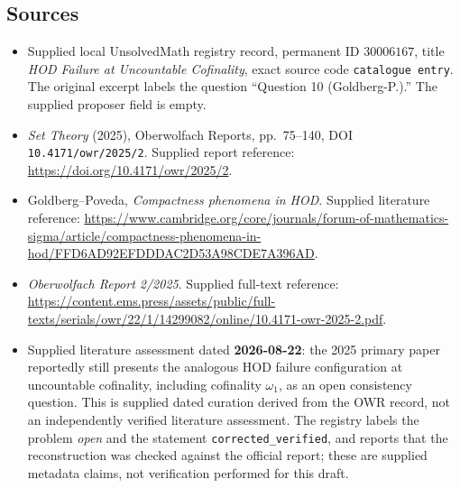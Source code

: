 \documentclass[11pt]{article}
\begin{document}
\subsection{Sources}
\begin{itemize}
\item Supplied local UnsolvedMath registry record, permanent ID \(30006167\), title \emph{HOD Failure at Uncountable Cofinality}, exact source code \texttt{catalogue entry}. The original excerpt labels the question ``Question 10 (Goldberg-P.).'' The supplied proposer field is empty.
\item \emph{Set Theory} (2025), Oberwolfach Reports, pp.\ 75--140, DOI \texttt{10.4171/owr/2025/2}. Supplied report reference: \url{https://doi.org/10.4171/owr/2025/2}.
\item Goldberg--Poveda, \emph{Compactness phenomena in HOD}. Supplied literature reference: \url{https://www.cambridge.org/core/journals/forum-of-mathematics-sigma/article/compactness-phenomena-in-hod/FFD6AD92EFDDDAC2D53A98CDE7A396AD}.
\item \emph{Oberwolfach Report 2/2025}. Supplied full-text reference: \url{https://content.ems.press/assets/public/full-texts/serials/owr/22/1/14299082/online/10.4171-owr-2025-2.pdf}.
\item Supplied literature assessment dated \textbf{2026-08-22}: the 2025 primary paper reportedly still presents the analogous HOD failure configuration at uncountable cofinality, including cofinality \(\omega_1\), as an open consistency question. This is supplied dated curation derived from the OWR record, not an independently verified literature assessment. The registry labels the problem \emph{open} and the statement \texttt{corrected\_verified}, and reports that the reconstruction was checked against the official report; these are supplied metadata claims, not verification performed for this draft.
\end{itemize}
\end{document}
